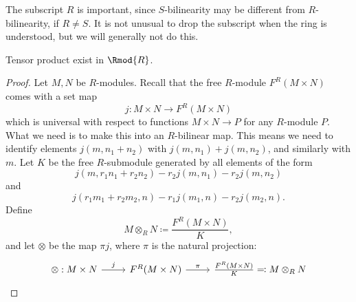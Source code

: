 The subscript $R$ is important, since $S$-bilinearity may be different from $R$-bilinearity, if $R\neq S$. It is not unusual to drop the subscript when the ring is understood, but we will generally not do this.

\begin{lemma}\label{lma:8.2}
	Tensor product exist in $\Rmod{R} $.
\end{lemma}
\begin{proof}
	Let $M,N$ be $R$-modules. Recall that the free $R$-module $F^R(M\times N)$ comes with a set map
	\[
		j : M\times N \to F^R(M\times N)
	\]
	which is universal with respect to functions $M\times N\to P$ for any $R$-module $P$. What we need is to make this into an $R$-bilinear map. This means we need to identify elements $j(m,n_1+n_2)$ with $j(m,n_1)+j(m,n_2)$, and similarly with $m$. Let $K$ be the free $R$-submodule generated by all elements of the form
	\[
		j(m,r_1n_1+r_2n_2)-r_2j(m,n_1)-r_2j(m,n_2)
	\]
	and
	\[
		j(r_1m_1+r_2m_2,n)-r_1j(m_1,n)-r_2j(m_2,n)
	.\]
	Define
	\[
		M\otimes_R N\coloneqq \frac{F^R(M\times N)}{K} 
	,\]
	and let $\otimes $ be the map $\pi j$, where $\pi $ is the natural projection:
	\[\begin{tikzcd}[row sep = 2.5em, column sep = 2.5em]
		\otimes :M\times N\arrow[r, "j"]&F^R(M\times N)\arrow[r, "\pi "]&\frac{F^R(M\times N)}{K} \eqqcolon M\otimes_R N
	\end{tikzcd}\]
	

\end{proof}
